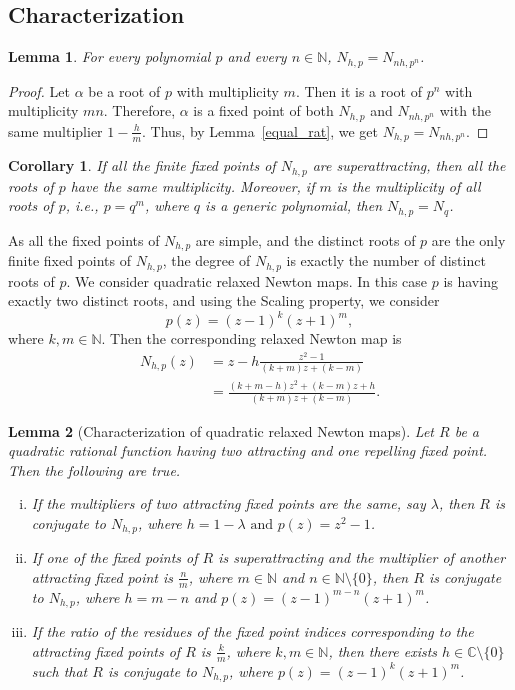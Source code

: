 \documentclass[12pt]{article}
\newtheorem{cor}{Corollary}[section]
\newtheorem{lem}{Lemma}[section]
\numberwithin{equation}{section}
\begin{document}
\subsection{Characterization}
\begin{lem}\label{equal_pwr}
For every polynomial $p$ and every $n\in \mathbb{N}$, $N_{h, p}=N_{nh,p^n}$.
\end{lem}
\begin{proof}
Let $\alpha$ be a root of $p$ with multiplicity $m$. Then it is a root of $p^n$ with multiplicity $mn$. Therefore, $\alpha$ is a fixed point of both $N_{h, p}$ and $N_{nh,p^n}$ with the same multiplier $1-\frac{h}{m}$. Thus, by Lemma~\ref{equal_rat}, we get $N_{h, p}=N_{nh,p^n}$.
\end{proof}
\begin{cor}
If all the finite fixed points of $N_{h,p}$ are superattracting, then all the roots of $p$ have the same multiplicity. Moreover, if $m$ is the multiplicity of all roots of $p$, i.e., $p=q^m$, where $q$ is a generic polynomial, then $N_{h,p}=N_q$.
\end{cor}
As all the fixed points of $N_{h,p}$ are simple, and the distinct roots of $p$ are the only finite fixed points of $N_{h,p}$, the degree of $N_{h,p}$ is exactly the number of distinct roots of $p$. We consider quadratic relaxed Newton maps. In this case $p$ is having exactly two distinct roots, and using the Scaling property, we consider
$$
p(z)=(z-1)^{k}(z+1)^{m},
$$
where $k, m \in \mathbb{N}$. Then the corresponding relaxed Newton map is
\begin{align*}
N_{h, p}(z) & =z-h \frac{z^{2}-1}{(k+m) z+(k-m)}  \nonumber\\
& =\frac{(k+m-h) z^{2}+(k-m) z+h}{(k+m) z+(k-m)}. \nonumber
\end{align*}
\begin{lem}[Characterization of quadratic relaxed Newton maps]
Let $R$ be a quadratic rational function having two attracting and one repelling fixed point. Then the following are true.
\begin{enumerate}[(i)]
\item If the multipliers of two attracting fixed points are the same, say $\lambda$, then $R$ is conjugate to $N_{h, p}$, where
$
h=1-\lambda \text { and } p(z)=z^{2}-1
$.
\item If one of the fixed points of $R$ is superattracting and the multiplier of another attracting fixed point is $\frac{n}{m}$, where $m\in \mathbb{N}$ and $n \in \mathbb{N}\setminus \{0\}$, then $R$ is conjugate to $N_{h, p}$, where $h=m-n$ and $p(z)=(z-1)^{m-n}(z+1)^{m}$.
\item If the ratio of the residues of the fixed point indices corresponding to the attracting fixed points of $R$ is $\frac{k}{m}$, where $k,m\in \mathbb{N}$, then there exists $h\in \mathbb{C}\setminus \{0\}$ such that $R$ is conjugate to $N_{h, p}$, where $p(z)=(z-1)^{k}(z+1)^{m}$.
 \end{enumerate}
\end{lem}
\end{document}
